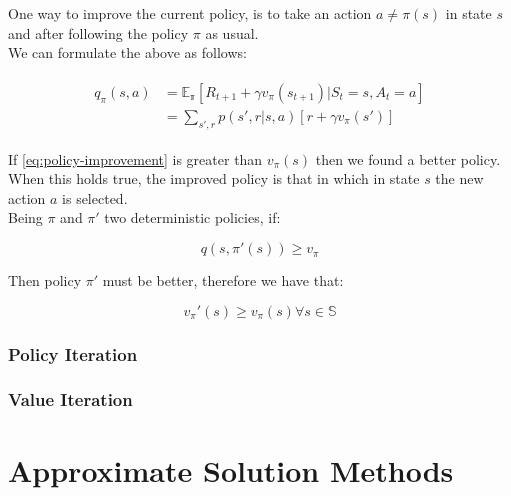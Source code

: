 \documentclass[paper=a4,fontsize=11pt]{scrartcl} %
\numberwithin{equation}{section} %
\numberwithin{figure}{section} %
\numberwithin{table}{section} %
\begin{document}
One way to improve the current policy, is to take an action $a \neq \pi(s)$
in state $s$ and after following the policy $\pi$ as usual. \\

We can formulate the above as follows:

\begin{align}
    \begin{aligned}
        q_\pi(s,a) &= \mathbb{E_\pi} \left[ 
            R_{t+1} + \gamma v_\pi(s_{t+1}) | S_t=s, A_t=a
        \right] \\
        &= \sum_{s',r} p(s',r|s, a) \left[ r + \gamma v_\pi(s') \right]
    \end{aligned}
    \label{eq:policy-improvement}
\end{align}

If \ref{eq:policy-improvement} is greater than $v_\pi(s)$ then we found a better policy. When this holds true, the improved policy is that in which in state $s$
the new action $a$ is selected. \\

Being $\pi$ and $\pi'$ two deterministic policies, if:

\begin{equation}
    q(s, \pi'(s)) \geq v_\pi
\end{equation}

Then policy $\pi'$ must be better, therefore we have that:

\begin{equation}
    v_\pi'(s) \geq v_\pi(s) \forall s \in \mathbb{S}
\end{equation}

\subsubsection{Policy Iteration}

\subsubsection{Value Iteration}




\section{Approximate Solution Methods}
\end{document}
